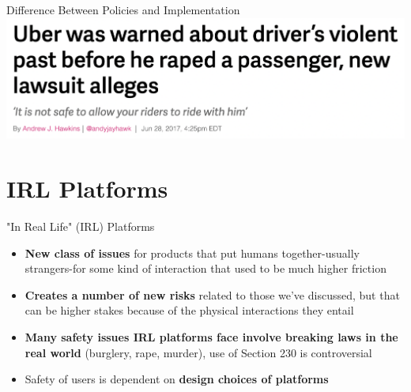 \documentclass[nobackground,dvipsnames,table,aspectratio=169]{beamer}
\begin{document}
\begin{frame}{Difference Between Policies and Implementation}
    \centering
    \includegraphics[width=\textwidth]{uber-reported-driver-headline}
\end{frame}

\section{IRL Platforms}

\begin{frame}{"In Real Life" (IRL) Platforms}
    \begin{itemize}
        \item \textbf{New class of issues} for products that put humans together-usually strangers-for some kind of interaction that used to be much higher friction
        \item \textbf{Creates a number of new risks} related to those we’ve discussed, but that can be higher stakes because of the physical interactions they entail
        \item \textbf{Many safety issues IRL platforms face involve breaking laws in the real world} (burglery, rape, murder), use of Section 230 is controversial
        \item Safety of users is dependent on \textbf{design choices of platforms}
    \end{itemize}
\end{frame}
\end{document}
